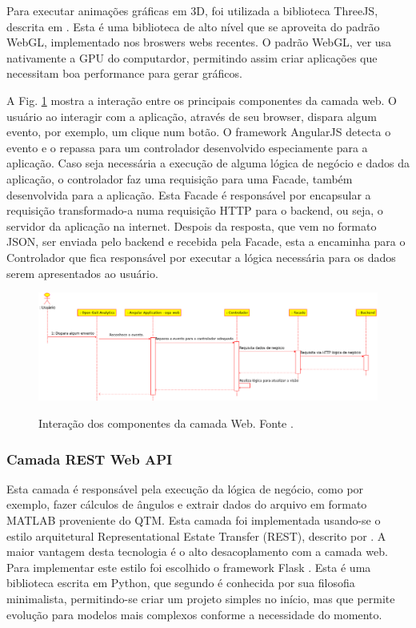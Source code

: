\documentclass[journal]{IEEEtran}
\begin{document}
Para executar animações gráficas em 3D, foi utilizada a biblioteca ThreeJS, descrita em \cite{Dirksen2015}.
Esta é uma biblioteca de alto nível que se aproveita do padrão WebGL, implementado
nos broswers webs recentes. O padrão WebGL, ver \cite{Matsuda2013} usa nativamente a GPU do computardor, 
permitindo assim criar aplicações que necessitam boa performance para gerar
gráficos. 

A Fig. \ref{camada_web} mostra a interação entre os principais componentes da camada web.
O usuário ao interagir com a aplicação, através de seu browser, dispara algum evento, 
por exemplo, um clique num botão. O framework AngularJS detecta o evento e o repassa
para um controlador desenvolvido especiamente para a aplicação. Caso seja necessária 
a execução de alguma lógica de negócio e dados da aplicação, o controlador faz uma
requisição para uma Facade, também desenvolvida para a aplicação. Esta Facade é responsável
por encapsular a requisição transformado-a numa requisição HTTP para o backend, ou seja, 
o servidor da aplicação na internet. Despois da resposta, que vem no formato JSON, ser
enviada pelo backend e recebida pela Facade, esta a encaminha para o Controlador que
fica responsável por executar a lógica necessária para os dados serem apresentados ao 
usuário.

\begin{figure}[tb]
	\centering
	{\includegraphics[width=\textwidth]{camada_web}}
	\caption{Interação dos componentes da camada Web. Fonte \cite{Lima2015}.}
	\label{camada_web}
\end{figure}

\subsubsection{Camada REST Web API}

Esta camada é responsável pela execução da lógica de negócio, como por exemplo,
fazer cálculos de ângulos e extrair dados do arquivo em formato MATLAB proveniente do QTM.
Esta camada foi implementada usando-se o estilo arquitetural Representational Estate Transfer (REST),
descrito por \cite{Grinberg2014}. A maior vantagem desta tecnologia é o alto desacoplamento com a
camada web. Para implementar este estilo foi escolhido o framework Flask \cite{Maia2015}. Esta é 
uma biblioteca escrita em Python,  que segundo \cite{Maia2015} é conhecida por sua filosofia minimalista,
permitindo-se criar um projeto simples no início, mas que permite evolução para modelos
mais complexos conforme a necessidade do momento.
\end{document}
